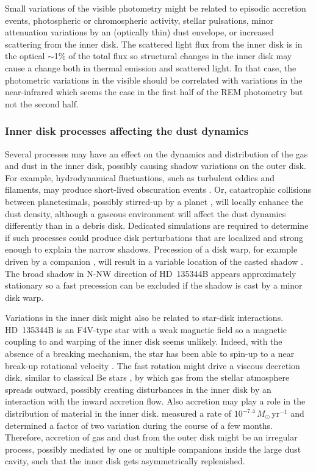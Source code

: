 \documentclass[twocolumn,tighten]{aastex61}
\begin{document}
Small variations of the visible photometry might be related to episodic accretion events, photospheric or chromospheric activity, stellar pulsations, minor attenuation variations by an (optically thin) dust envelope, or increased scattering from the inner disk. The scattered light flux from the inner disk is in the optical $\sim$1\% of the total flux so structural changes in the inner disk may cause a change both in thermal emission and scattered light. In that case, the photometric variations in the visible should be correlated with variations in the near-infrared which seems the case in the first half of the REM photometry but not the second half.

\subsubsection{Inner disk processes affecting the dust dynamics}\label{sec:processes}

Several processes may have an effect on the dynamics and distribution of the gas and dust in the inner disk, possibly causing shadow variations on the outer disk. For example, hydrodynamical fluctuations, such as turbulent eddies and filaments, may produce short-lived obscuration events \citep{dullemond2003,flock2017}. Or, catastrophic collisions between planetesimals, possibly stirred-up by a planet \citep{kenyon2004}, will locally enhance the dust density, although a gaseous environment will affect the dust dynamics differently than in a debris disk. Dedicated simulations are required to determine if such processes could produce disk perturbations that are localized and strong enough to explain the narrow shadows. Precession of a disk warp, for example driven by a companion \citep{lai2014}, will result in a variable location of the casted shadow \citep{debes2017}. The broad shadow in N-NW direction of HD~135344B appears approximately stationary so a fast precession can be excluded if the shadow is cast by a minor disk warp.

Variations in the inner disk might also be related to star-disk interactions. HD~135344B is an F4V-type star with a weak magnetic field \citep[$\langle B_{\rm z} \rangle = 32 \pm 15$\,G;][]{hubrig2009} so a magnetic coupling to and warping of the inner disk seems unlikely. Indeed, with the absence of a breaking mechanism, the star has been able to spin-up to a near break-up rotational velocity \citep{muller2011}. The fast rotation might drive a viscous decretion disk, similar to classical Be stars \citep{rivinius2013}, by which gas from the stellar atmosphere spreads outward, possibly creating disturbances in the inner disk by an interaction with the inward accretion flow. Also accretion may play a role in the distribution of material in the inner disk. \citet{fairlamb2015} measured a rate of $10^{-7.4}$\,$M_\odot$\,yr$^{-1}$ and \citet{sitko2012} determined a factor of two variation during the course of a few months. Therefore, accretion of gas and dust from the outer disk might be an irregular process, possibly mediated by one or multiple companions inside the large dust cavity, such that the inner disk gets asymmetrically replenished.
\end{document}
